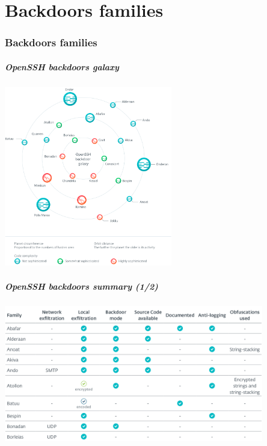 \part{Backdoors families}
\section{Backdoors families}

\begin{frame}
	\partpage
\end{frame}

\begin{frame}
	\frametitle{OpenSSH backdoors galaxy}
	
   \begin{center}    
   \includegraphics[width=0.55\textwidth]{images/OpenSSH_backdoor_galaxy}
   \end{center}

\end{frame}


\begin{frame}
	\frametitle{OpenSSH backdoors summary (1/2)}
	
   \begin{center}    
   \includegraphics[width=0.85\textwidth]{images/families1}
   \end{center}

\end{frame}


